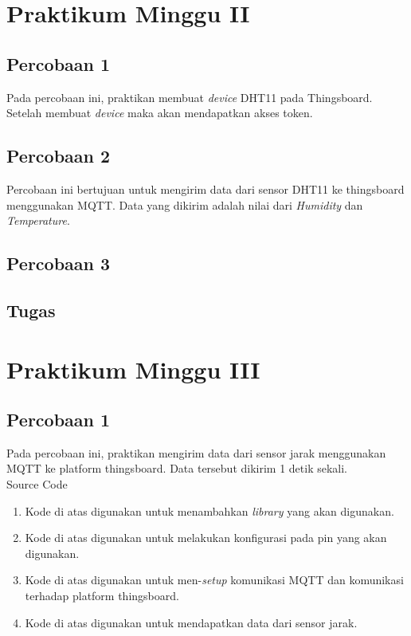 \documentclass{class}
\begin{document}
  \section{Praktikum Minggu II}
  \subsection{Percobaan 1}
    Pada percobaan ini, praktikan membuat \emph{device} DHT11 pada Thingsboard.
    Setelah membuat \emph{device} maka akan mendapatkan akses token.
  \subsection{Percobaan 2}
    Percobaan ini bertujuan untuk mengirim data dari sensor DHT11 ke thingsboard menggunakan MQTT.
    Data yang dikirim adalah nilai dari \emph{Humidity} dan \emph{Temperature}.

  \subsection{Percobaan 3}
  \subsection{Tugas}
\section{Praktikum Minggu III}
    \subsection{Percobaan 1}
    Pada percobaan ini, praktikan mengirim data dari sensor jarak menggunakan MQTT ke platform thingsboard.
    Data tersebut dikirim 1 detik sekali. \\
    Source Code
    \begin{enumerate}
      \item 
      Kode di atas digunakan untuk menambahkan \emph{library} yang akan digunakan. \\
      \item 
      Kode di atas digunakan untuk melakukan konfigurasi pada pin yang akan digunakan. \\
      \item 
      Kode di atas digunakan untuk men-\emph{setup} komunikasi MQTT dan komunikasi terhadap platform thingsboard. \\
      \item 
      Kode di atas digunakan untuk mendapatkan data dari sensor jarak.
    \end{enumerate}
\end{document}
